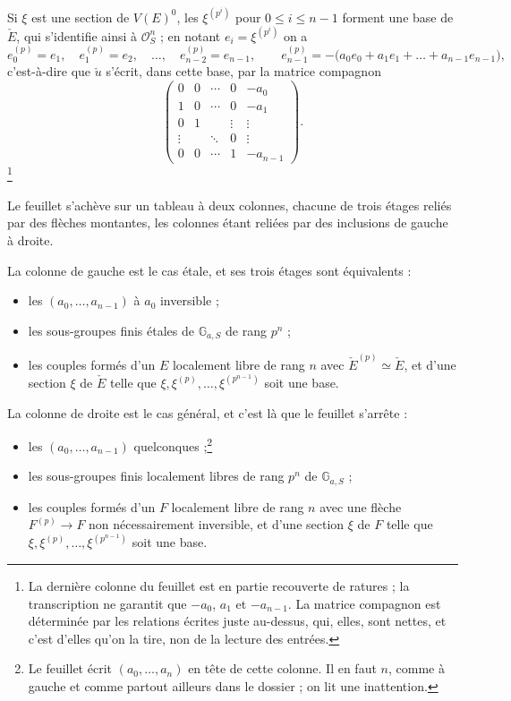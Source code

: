 \documentclass[11pt,a4paper]{article}
\begin{document}
Si $\xi$ est une section de $V(E)^0$, les $\xi^{(p^i)}$ pour
$0 \leqslant i \leqslant n-1$ forment une base de $\check{E}$, qui s'identifie
ainsi à $\mathcal{O}_S^n$ ; en notant $e_i = \xi^{(p^i)}$ on a
\[
  e_0^{(p)} = e_1, \quad e_1^{(p)} = e_2, \quad \dots, \quad
  e_{n-2}^{(p)} = e_{n-1}, \qquad
  e_{n-1}^{(p)} = -\bigl(a_0 e_0 + a_1 e_1 + \dots + a_{n-1} e_{n-1}\bigr),
\]
c'est-à-dire que $\check{u}$ s'écrit, dans cette base, par la matrice
compagnon
\[
  \begin{pmatrix}
    0 & 0 & \cdots & 0 & -a_0 \\
    1 & 0 & \cdots & 0 & -a_1 \\
    0 & 1 & & \vdots & \vdots \\
    \vdots & & \ddots & 0 & \vdots \\
    0 & 0 & \cdots & 1 & -a_{n-1}
  \end{pmatrix} .
\]
\footnote{La dernière colonne du feuillet est en partie recouverte de
ratures ; la transcription ne garantit que $-a_0$, $a_1$ et $-a_{n-1}$. La
matrice compagnon est déterminée par les relations écrites juste au-dessus,
qui, elles, sont nettes, et c'est d'elles qu'on la tire, non de la lecture
des entrées.}

Le feuillet s'achève sur un tableau à deux colonnes, chacune de trois étages
reliés par des flèches montantes, les colonnes étant reliées par des
inclusions de gauche à droite.

La colonne de gauche est le cas étale, et ses trois étages sont équivalents :

\begin{itemize}
\item les $(a_0, \dots, a_{n-1})$ à $a_0$ inversible ;
\item les sous-groupes finis étales de $\mathbb{G}_{a,S}$ de rang $p^n$ ;
\item les couples formés d'un $E$ localement libre de rang $n$ avec
$\check{E}^{(p)} \simeq \check{E}$, et d'une section $\xi$ de $\check{E}$
telle que $\xi, \xi^{(p)}, \dots, \xi^{(p^{n-1})}$ soit une base.
\end{itemize}

La colonne de droite est le cas général, et c'est là que le feuillet
s'arrête :

\begin{itemize}
\item les $(a_0, \dots, a_{n-1})$ quelconques ;\footnote{Le feuillet écrit
$(a_0, \dots, a_n)$ en tête de cette colonne. Il en faut $n$, comme à gauche
et comme partout ailleurs dans le dossier ; on lit une inattention.}
\item les sous-groupes finis localement libres de rang $p^n$ de
$\mathbb{G}_{a,S}$ ;
\item les couples formés d'un $F$ localement libre de rang $n$ avec une
flèche $F^{(p)} \to F$ non nécessairement inversible, et d'une section $\xi$
de $F$ telle que $\xi, \xi^{(p)}, \dots, \xi^{(p^{n-1})}$ soit une base.
\end{itemize}
\end{document}
